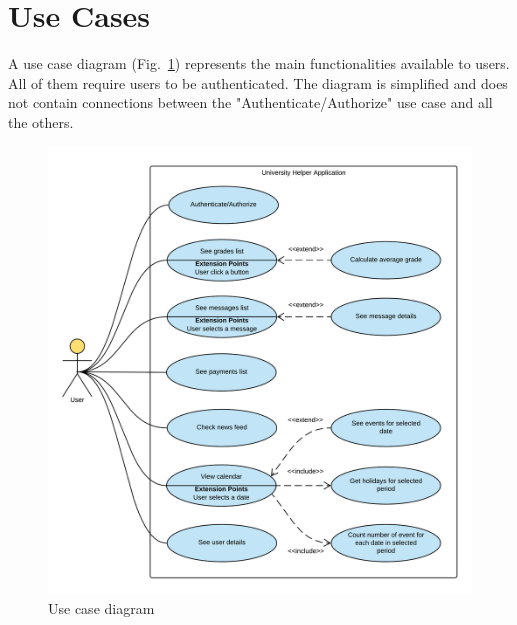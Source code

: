 \section{Use Cases}
A use case diagram (Fig.~\ref{fig:use-case-diagram}) represents the main functionalities available to users. All of them require users to be authenticated. The diagram is simplified and does not contain connections between the "Authenticate/Authorize" use case and all the others.

\begin{figure}[htb]
    \centering
    \includegraphics[width=\textwidth]{fig02/use_case_diagram.png}
    \caption{Use case diagram} \label{fig:use-case-diagram}
\end{figure}


